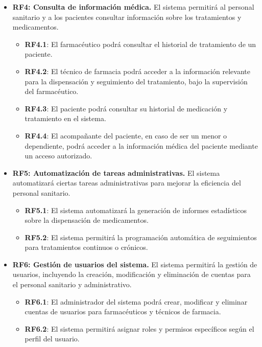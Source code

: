 \begin{itemize}
	\item \textbf{RF4: Consulta de información médica.} El sistema permitirá al personal sanitario y a los pacientes consultar información sobre los tratamientos y medicamentos.
	
	\begin{itemize}
		\item \textbf{RF4.1}: El farmacéutico podrá consultar el historial de tratamiento de un paciente.
		\item \textbf{RF4.2}: El técnico de farmacia podrá acceder a la información relevante para la dispensación y seguimiento del tratamiento, bajo la supervisión del farmacéutico.
		\item \textbf{RF4.3}: El paciente podrá consultar su historial de medicación y tratamiento en el sistema.
		\item \textbf{RF4.4}: El acompañante del paciente, en caso de ser un menor o dependiente, podrá acceder a la información médica del paciente mediante un acceso autorizado.
	\end{itemize}
	
	\item \textbf{RF5: Automatización de tareas administrativas.} El sistema automatizará ciertas tareas administrativas para mejorar la eficiencia del personal sanitario.
	
	\begin{itemize}
		\item \textbf{RF5.1}: El sistema automatizará la generación de informes estadísticos sobre la dispensación de medicamentos.
		\item \textbf{RF5.2}: El sistema permitirá la programación automática de seguimientos para tratamientos continuos o crónicos.
	\end{itemize}
	
	\item \textbf{RF6: Gestión de usuarios del sistema.} El sistema permitirá la gestión de usuarios, incluyendo la creación, modificación y eliminación de cuentas para el personal sanitario y administrativo.
	
	\begin{itemize}
		\item \textbf{RF6.1}: El administrador del sistema podrá crear, modificar y eliminar cuentas de usuarios para farmacéuticos y técnicos de farmacia.
		\item \textbf{RF6.2}: El sistema permitirá asignar roles y permisos específicos según el perfil del usuario.
	\end{itemize}
	

\end{itemize}
